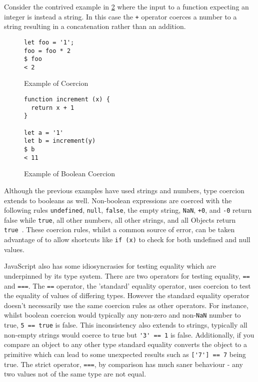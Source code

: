 \documentclass[]{final_report}
\begin{document}
Consider the contrived example in \ref{fig:js-bool-coercion} where the input to a function expecting an integer is instead a string. In this case the \lstinline{+} operator coerces a number to a string resulting in a concatenation rather than an addition.

\begin{figure}[h]
\begin{verbatim}
let foo = '1';
foo = foo * 2
$ foo
< 2
\end{verbatim}
\caption{\label{fig:js-coercion} Example of Coercion}
\end{figure} 

\begin{figure}[h]
\begin{verbatim}
function increment (x) {
  return x + 1
}

let a = '1'
let b = increment(y)
$ b
< 11
\end{verbatim}
\caption{\label{fig:js-bool-coercion} Example of Boolean Coercion}
\end{figure} 

Although the previous examples have used strings and numbers, type coercion extends to booleans as well. Non-boolean expressions are coerced with the following rules \lstinline{undefined}, \lstinline{null}, \lstinline{false}, the empty string, \lstinline{NaN}, \lstinline{+0}, and \lstinline{-0} return false while \lstinline{true}, all other numbers, all other strings, and all Objects return \lstinline{true}~\cite{EcmaScript}. These coercion rules, whilst a common source of error, can be taken advantage of to allow shortcuts like \lstinline{if (x)} to check for both undefined and null values.

JavaScript also has some idiosyncrasies for testing equality which are underpinned by its type system. There are two operators for testing equality, \lstinline{==} and \lstinline{===}. The \lstinline{==} operator, the 'standard' equality operator, uses coercion to test the equality of values of differing types. However the standard equality operator doesn't necessarily use the same coercion rules as other operators. For instance, whilst boolean coercion would typically any non-zero and non-\lstinline{NaN} number to true, \lstinline{5 == true} is false. This inconsistency also extends to strings, typically all non-empty strings would coerce to true but \lstinline{'3' == 1} is false. Additionally, if you compare an object to any other type standard equality converts the object to a primitive which can lead to some unexpected results such as \lstinline{['7'] == 7}  being true. The strict operator, \lstinline{===}, by comparison has much saner behaviour - any two values not of the same type are not equal.
\end{document}
